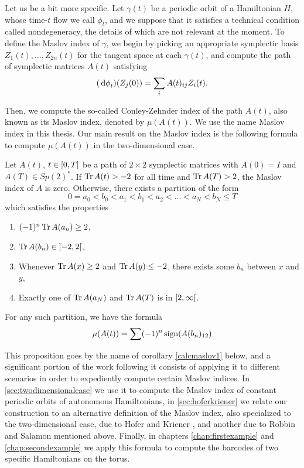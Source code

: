 Let us be a bit more specific. Let $\gamma(t)$ be a periodic orbit of a Hamiltonian $H$, whose time-$t$ flow we call $\phi_t$, and we suppose that it satisfies a technical condition called nondegeneracy, the details of which are not relevant at the moment. To define the Maslov index of $\gamma$, we begin by picking an appropriate symplectic basis $Z_1(t), \dots, Z_{2n}(t)$ for the tangent space at each $\gamma(t)$, and compute the path of symplectic matrices $A(t)$ satisfying
\begin{equation}
(\dl \phi_t)(Z_j(0)) = \sum_i A(t)_{ij} Z_i(t).
\end{equation}

Then, we compute the so-called Conley-Zehnder index of the path $A(t)$, also known as its Maslov index, denoted by $\mu(A(t))$. We use the name Maslov index in this thesis. Our main result on the Maslov index is the following formula to compute $\mu(A(t))$ in the two-dimensional case.
\begin{prop*}
Let $A(t)$, $t \in \interval 0 T$ be a path of $2 \times 2$ symplectic matrices with $A(0) = I$ and $A(T) \in Sp(2)^*$. If $\operatorname{Tr} A(t) > -2$ for all time and $\operatorname{Tr} A(T) > 2$, the Maslov index of $A$ is zero. Otherwise, there exists a partition of the form
\begin{equation*}
0 = a_0 < b_0 < a_1 < b_1 < a_2 < \dots < a_N < b_N \leq T
\end{equation*}
which satisfies the properties
\begin{enumerate}
\item $(-1)^n \operatorname{Tr} A(a_n) \geq 2$,
\item $\trace A(b_n) \in \ointerval{-2}2$,
\item Whenever $\operatorname{Tr} A(x) \geq 2$ and $\operatorname{Tr} A(y) \leq -2$, there exists some $b_n$ between $x$ and $y$,
\item Exactly one of $\operatorname{Tr} A(a_N)$ and $\operatorname{Tr} A(T)$ is in $\rinterval 2 \infty$.
\end{enumerate}

For any such partition, we have the formula
\begin{equation*}
\mu(A(t)) = \sum (-1)^n \operatorname{sign}(A(b_n)_{12})
\end{equation*}
\end{prop*}
This proposition goes by the name of corollary \ref{calcmaslov1} below, and a significant portion of the work following it consists of applying it to different scenarios in order to expediently compute certain Maslov indices.  In \ref{sec:twodimensionalcase} we use it to compute the Maslov index of constant periodic orbits of autonomous Hamiltonians, in \ref{sec:hoferkriener} we relate our construction to an alternative definition of the Maslov index, also specialized to the two-dimensional case, due to Hofer and Kriener \cite{hoferkriener}, and another due to Robbin and Salamon mentioned above. Finally, in chapters \ref{chap:firstexample} and \ref{chap:secondexample} we apply this formula to compute the barcodes of two specific Hamiltonians on the torus.
